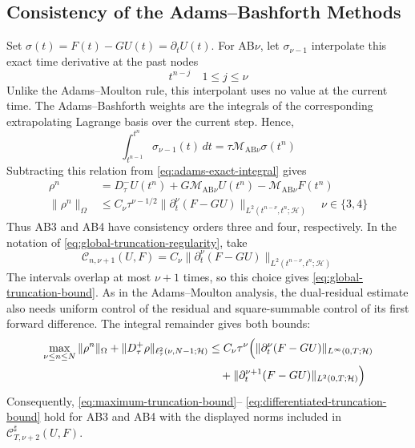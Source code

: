 \documentclass[11pt]{article}
\begin{document}
\subsection{Consistency of the Adams--Bashforth Methods}
\label{subsec:adams-bashforth-consistency}
Set \(\sigma(t)=F(t)-GU(t)=\partial_tU(t)\). For AB\(\nu\), let \(\sigma_{\nu-1}\)
interpolate this exact time derivative at the past nodes
\begin{equation}
t^{n-j}\quad 1\le j\le \nu \label{eq:ab-interpolation-nodes}
\end{equation}
Unlike the Adams--Moulton rule, this interpolant uses no value at the current
time. The Adams--Bashforth weights are the integrals of the corresponding
extrapolating Lagrange basis over the current step. Hence,
\begin{equation}
\int_{t^{n-1}}^{t^n}\sigma_{\nu-1}(t)\,dt
=\tau\mathcal M_{\mathrm{AB}\nu}\sigma(t^n) \label{eq:ab-interpolatory-quadrature}
\end{equation}
Subtracting this relation from \eqref{eq:adams-exact-integral} gives
\begin{align}
\rho^n
&=D_{\tau}^{-}U(t^n)+G\mathcal M_{\mathrm{AB}\nu}U(t^n)
-\mathcal M_{\mathrm{AB}\nu}F(t^n) \label{eq:ab-truncation-residual}\\
\|\rho^n\|_{\Omega}
&\le C_\nu\tau^{\nu-1/2}
\|\partial_t^\nu(F-GU)\|_{L^2(t^{n-\nu},t^n;\mathcal H)}
\quad \nu\in\{3,4\} \label{eq:ab-truncation-bound}
\end{align}
Thus AB3 and AB4 have consistency orders three and four, respectively. In
the notation of \eqref{eq:global-truncation-regularity}, take
\begin{equation}
\mathcal C_{n,\nu+1}(U,F)
=C_\nu\|\partial_t^\nu(F-GU)\|_{L^2(t^{n-\nu},t^n;\mathcal H)}
\label{eq:ab-local-truncation-regularity}
\end{equation}
The intervals overlap at most \(\nu+1\) times, so this choice gives
\eqref{eq:global-truncation-bound}. As in the Adams--Moulton analysis, the
dual-residual estimate also needs uniform control of the residual and
square-summable control of its first forward difference. The integral
remainder gives both bounds:
\begin{align}
\max_{\nu\le n\le N}\|\rho^n\|_{\Omega}
+\|D_{\tau}^{+}\rho\|_{\ell_{\tau}^2(\nu,N-1;\mathcal H)}
&\le C_\nu\tau^\nu\Bigl(
\|\partial_t^\nu(F-GU)\|_{L^{\infty}(0,T;\mathcal H)}
\label{eq:ab-differentiated-consistency-main}\\
&\quad+\|\partial_t^{\nu+1}(F-GU)\|_{L^2(0,T;\mathcal H)}\Bigr)
\label{eq:ab-differentiated-consistency-derivative}
\end{align}
Consequently, \eqref{eq:maximum-truncation-bound}--
\eqref{eq:differentiated-truncation-bound} hold for AB3 and AB4 with the
displayed norms included in \(\mathcal C^{\sharp}_{T,\nu+2}(U,F)\).
\end{document}

